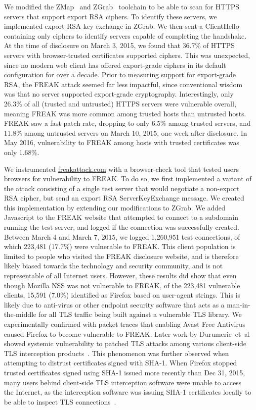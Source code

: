 We modified the ZMap~\cite{zmap-2013} and ZGrab~\cite{zgrab-github} toolchain
to be able to scan for HTTPS servers that support export RSA ciphers. To
identify these servers, we implemented export RSA key exchange in ZGrab. We
then sent a \textsf{ClientHello} containing only \rsaexp{} ciphers to
identify servers capable of completing the handshake. At the time of
disclosure on March 3, 2015, we found that 36.7\% of HTTPS servers with
browser-trusted certificates supported \rsaexp{} ciphers. This was
unexpected, since no modern web client has offered export-grade ciphers in
its default configuration for over a decade. Prior to measuring support for
export-grade RSA, the FREAK attack seemed far less impactful, since
conventional wisdom was that no server supported export-grade cryptography.
Interestingly, only 26.3\% of all (trusted and untrusted) HTTPS servers were
vulnerable overall, meaning FREAK was more common among trusted hosts than
untrusted hosts. FREAK saw a fast patch rate, dropping to only 6.5\% among
trusted servers, and 11.8\% among untrusted servers on March 10, 2015, one
week after disclosure. In May 2016, vulnerability to FREAK among hosts with
trusted certificates was only 1.68\%.

We instrumented \url{freakattack.com} with a browser-check tool that tested
users browsers for vulnerability to FREAK. To do so, we first implemented a
variant of the attack consisting of a single test server that would
negotiate a non-export RSA cipher, but send an export RSA \textsf{ServerKeyExchange}
message. We created this implementation by extending our modifications to
ZGrab. We added Javascript to the FREAK website that attempted to connect to
a subdomain running the test server, and logged if the connection was
successfully created. Between March 4 and March 7, 2015, we logged 1,260,951
test connections, of which 223,481 (17.7\%) were vulnerable to FREAK. This
client population is limited to people who visited the FREAK disclosure
website, and is therefore likely biased towards the technology and security
community, and is not representable of all Internet users. However, these
results did show that even though Mozilla NSS was not vulnerable to FREAK, of
the 223,481 vulnerable clients, 15,591 (7.0\%) identified as Firefox based on
user-agent strings. This is likely due to anti-virus or other endpoint
security software that acts as a man-in-the-middle for all TLS traffic being
built against a vulnerable TLS library. We experimentally confirmed with
packet traces that enabling Avast Free Antivirus caused Firefox to become
vulnerable to FREAK. Later work by Durumeric~et~al showed systemic
vulnerability to patched TLS attacks among various client-side TLS
interception products~\cite{tls-interception-2017}. This phenomenon was
further observed when attempting to distrust certificates signed with SHA-1.
When Firefox stopped trusted certificates signed using SHA-1 issued more
recently than Dec 31, 2015, many users behind client-side TLS interception
software were unable to access the Internet, as the interception software was
issuing SHA-1 certificates locally to be able to inspect TLS
connections~\cite{firefox-undo-sha1}.


